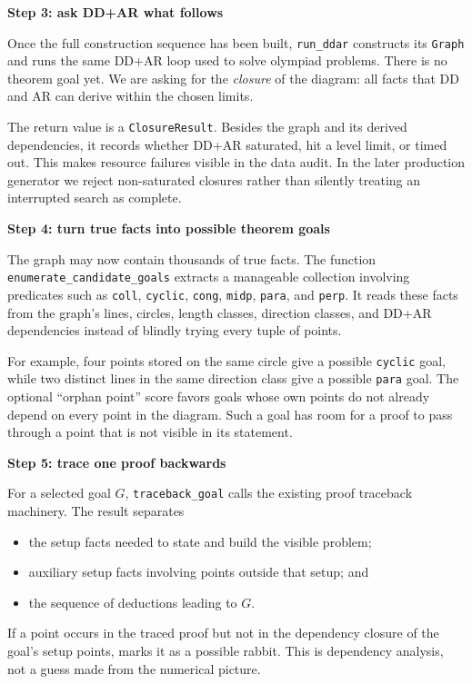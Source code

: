 \documentclass[reqno]{amsart}
\newcommand{\examplepart}[1]{%
    \par\medskip
    \noindent\textbf{\color{agblue}#1}\par\smallskip\noindent
}
\DeclareMathOperator{\1}{\textbf{1}}
\begin{document}
\examplepart{Step 3: ask DD+AR what follows}

Once the full construction sequence has been built, \verb|run_ddar| constructs
its \verb|Graph| and runs the same DD+AR loop used to solve olympiad problems.
There is no theorem goal yet. We are asking for the \emph{closure} of the
diagram: all facts that DD and AR can derive within the chosen limits.

The return value is a \verb|ClosureResult|. Besides the graph and its derived
dependencies, it records whether DD+AR saturated, hit a level limit, or timed
out. This makes resource failures visible in the data audit. In the later
production generator we reject non-saturated closures rather than silently
treating an interrupted search as complete.

\examplepart{Step 4: turn true facts into possible theorem goals}

The graph may now contain thousands of true facts. The function
\verb|enumerate_candidate_goals| extracts a manageable collection involving
predicates such as \verb|coll|, \verb|cyclic|, \verb|cong|, \verb|midp|,
\verb|para|, and \verb|perp|. It reads these facts from the graph's lines,
circles, length classes, direction classes, and DD+AR dependencies instead of
blindly trying every tuple of points.

For example, four points stored on the same circle give a possible
\verb|cyclic| goal, while two distinct lines in the same direction class give
a possible \verb|para| goal. The optional ``orphan point'' score favors goals
whose own points do not already depend on every point in the diagram. Such a
goal has room for a proof to pass through a point that is not visible in its
statement.

\examplepart{Step 5: trace one proof backwards}

For a selected goal $G$, \verb|traceback_goal| calls the existing proof
traceback machinery. The result separates
\begin{itemize}
    \item the setup facts needed to state and build the visible problem;
    \item auxiliary setup facts involving points outside that setup; and
    \item the sequence of deductions leading to $G$.
\end{itemize}
If a point occurs in the traced proof but not in the dependency closure of the
goal's setup points,  marks it as a possible rabbit.
This is dependency analysis, not a guess made from the numerical picture.
\end{document}
